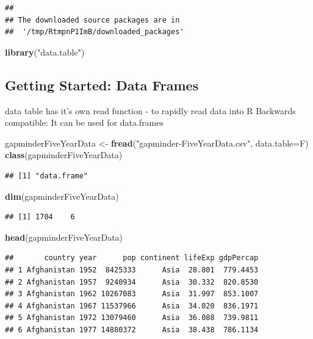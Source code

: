 \documentclass[]{article}
\newenvironment{Shaded}{\begin{snugshade}}{\end{snugshade}}
\newcommand{\KeywordTok}[1]{\textcolor[rgb]{0.13,0.29,0.53}{\textbf{{#1}}}}
\newcommand{\DataTypeTok}[1]{\textcolor[rgb]{0.13,0.29,0.53}{{#1}}}
\newcommand{\StringTok}[1]{\textcolor[rgb]{0.31,0.60,0.02}{{#1}}}
\newcommand{\NormalTok}[1]{{#1}}
\begin{document}
\begin{verbatim}
## 
## The downloaded source packages are in
##  '/tmp/RtmpnP1ImB/downloaded_packages'
\end{verbatim}

\begin{Shaded}
\begin{Highlighting}[]
\KeywordTok{library}\NormalTok{(}\StringTok{"data.table"}\NormalTok{)}
\end{Highlighting}
\end{Shaded}

\subsection{Getting Started: Data
Frames}\label{getting-started-data-frames}

data table has it's own read function - to rapidly read data into R
Backwards compatible: It can be used for data.frames

\begin{Shaded}
\begin{Highlighting}[]
\NormalTok{gapminderFiveYearData <-}\StringTok{ }\KeywordTok{fread}\NormalTok{(}\StringTok{"gapminder-FiveYearData.csv"}\NormalTok{, }\DataTypeTok{data.table=}\NormalTok{F)}
\KeywordTok{class}\NormalTok{(gapminderFiveYearData)}
\end{Highlighting}
\end{Shaded}

\begin{verbatim}
## [1] "data.frame"
\end{verbatim}

\begin{Shaded}
\begin{Highlighting}[]
\KeywordTok{dim}\NormalTok{(gapminderFiveYearData)}
\end{Highlighting}
\end{Shaded}

\begin{verbatim}
## [1] 1704    6
\end{verbatim}

\begin{Shaded}
\begin{Highlighting}[]
\KeywordTok{head}\NormalTok{(gapminderFiveYearData)}
\end{Highlighting}
\end{Shaded}

\begin{verbatim}
##       country year      pop continent lifeExp gdpPercap
## 1 Afghanistan 1952  8425333      Asia  28.801  779.4453
## 2 Afghanistan 1957  9240934      Asia  30.332  820.8530
## 3 Afghanistan 1962 10267083      Asia  31.997  853.1007
## 4 Afghanistan 1967 11537966      Asia  34.020  836.1971
## 5 Afghanistan 1972 13079460      Asia  36.088  739.9811
## 6 Afghanistan 1977 14880372      Asia  38.438  786.1134
\end{verbatim}
\end{document}
